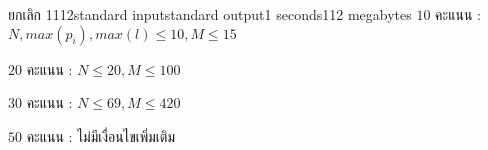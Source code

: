\documentclass[11pt,a4paper]{article}
\begin{document}
\begin{problem}{ยกเลิก 1112}{standard input}{standard output}{1 seconds}{112 megabytes}
$10$ คะแนน : $N, max(p_i), max(l) \le 10, M \le 15$

$20$ คะแนน : $N \le 20, M \le 100$

$30$ คะแนน : $N \le 69, M \le 420$

$50$ คะแนน : ไม่มีเงื่อนไขเพิ่มเติม

\Examples

\begin{example}
%
\end{example}

\end{problem}
\end{document}
